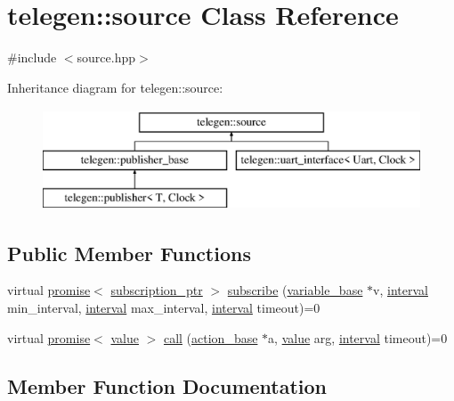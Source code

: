 \hypertarget{classtelegen_1_1source}{}\section{telegen\+:\+:source Class Reference}
\label{classtelegen_1_1source}


{\ttfamily \#include $<$source.\+hpp$>$}

Inheritance diagram for telegen\+:\+:source\+:\begin{figure}[H]
\begin{center}
\leavevmode
\includegraphics[height=3.000000cm]{classtelegen_1_1source}
\end{center}
\end{figure}
\subsection*{Public Member Functions}
\begin{DoxyCompactItemize}
\item 
virtual \hyperlink{namespacetelegen_a9dd802bb5d30cf96b0c616750d43ae86}{promise}$<$ \hyperlink{namespacetelegen_a27c822534a5231fe1c523c81e8768afb}{subscription\+\_\+ptr} $>$ \hyperlink{classtelegen_1_1source_a224b4eb02ea346aca099615a5ae00ea9}{subscribe} (\hyperlink{classtelegen_1_1variable__base}{variable\+\_\+base} $\ast$v, \hyperlink{namespacetelegen_ad925de2d0a99bc43918533abf0457344}{interval} min\+\_\+interval, \hyperlink{namespacetelegen_ad925de2d0a99bc43918533abf0457344}{interval} max\+\_\+interval, \hyperlink{namespacetelegen_ad925de2d0a99bc43918533abf0457344}{interval} timeout)=0
\item 
virtual \hyperlink{namespacetelegen_a9dd802bb5d30cf96b0c616750d43ae86}{promise}$<$ \hyperlink{classtelegen_1_1value}{value} $>$ \hyperlink{classtelegen_1_1source_ae14191b0e6aa10521bb3d8fa5e1747e9}{call} (\hyperlink{classtelegen_1_1action__base}{action\+\_\+base} $\ast$a, \hyperlink{classtelegen_1_1value}{value} arg, \hyperlink{namespacetelegen_ad925de2d0a99bc43918533abf0457344}{interval} timeout)=0
\end{DoxyCompactItemize}


\subsection{Member Function Documentation}
\mbox{\label{classtelegen_1_1source_ae14191b0e6aa10521bb3d8fa5e1747e9}} 
